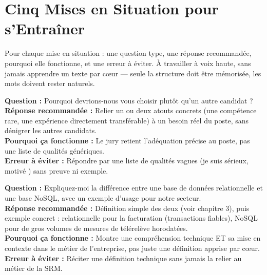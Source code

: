 \section{Cinq Mises en Situation pour s'Entraîner}
Pour chaque mise en situation : une question type, une réponse recommandée, pourquoi elle fonctionne, et une erreur à éviter. À travailler à voix haute, sans jamais apprendre un texte par cœur --- seule la structure doit être mémorisée, les mots doivent rester naturels.

\begin{tcolorbox}[colback=blue!4!white,colframe=blue!40!black,title=\textbf{Simulation 1 --- RH}]
\textbf{Question :} \og Pourquoi devrions-nous vous choisir plutôt qu'un autre candidat ? \fg{}\\
\textbf{Réponse recommandée :} Relier un ou deux atouts concrets (une compétence rare, une expérience directement transférable) à un besoin réel du poste, sans dénigrer les autres candidats.\\
\textbf{Pourquoi ça fonctionne :} Le jury retient l'adéquation précise au poste, pas une liste de qualités génériques.\\
\textbf{Erreur à éviter :} Répondre par une liste de qualités vagues (\og je suis sérieux, motivé \fg{}) sans preuve ni exemple.
\end{tcolorbox}

\begin{tcolorbox}[colback=blue!4!white,colframe=blue!40!black,title=\textbf{Simulation 2 --- Technique}]
\textbf{Question :} \og Expliquez-moi la différence entre une base de données relationnelle et une base NoSQL, avec un exemple d'usage pour notre secteur. \fg{}\\
\textbf{Réponse recommandée :} Définition simple des deux (voir chapitre 3), puis exemple concret : relationnelle pour la facturation (transactions fiables), NoSQL pour de gros volumes de mesures de télérelève horodatées.\\
\textbf{Pourquoi ça fonctionne :} Montre une compréhension technique ET sa mise en contexte dans le métier de l'entreprise, pas juste une définition apprise par cœur.\\
\textbf{Erreur à éviter :} Réciter une définition technique sans jamais la relier au métier de la SRM.
\end{tcolorbox}

